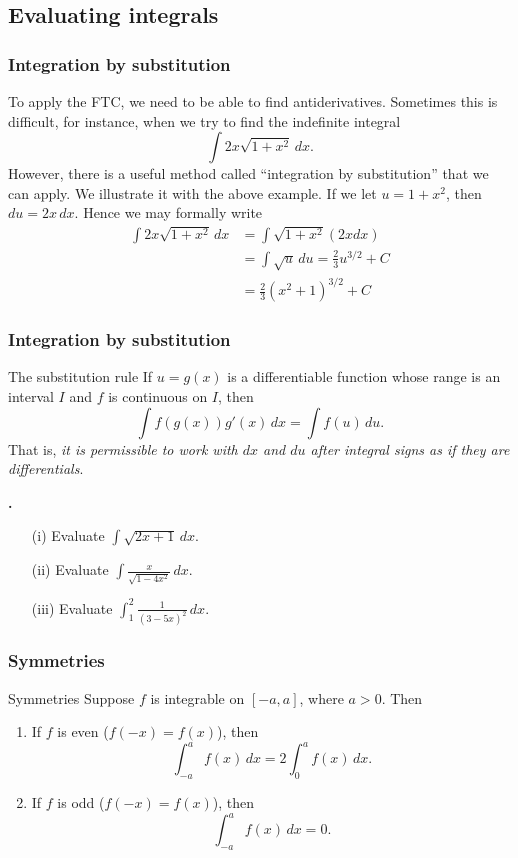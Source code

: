 \documentclass[t]{beamer}
\theoremstyle{plain}
\theoremstyle{definition}
\newcommand{\ds}{\displaystyle}
\newcommand{\dx}{\,dx}
\newcounter{heading}
\newcommand{\newhead}[1]{\medskip\stepcounter{heading}\noindent\textbf{\hspace{0.2cm}{#1}.}}
\begin{document}
\subsection{Evaluating integrals}
\begin{frame}
\frametitle{Integration by substitution}

To apply the FTC, we need to be able to find antiderivatives.  Sometimes this is difficult, for instance, when we try to find the indefinite integral
\[ \int 2x\sqrt{1 + x^{2}}\,dx.\]\pause
However, there is a useful method called ``integration by substitution'' that we can apply.  We illustrate it with the above example.  \pause
\medskip
\noindent If we let $u = 1 + x^{2}$, then $du = 2x\, dx$.  Hence we may formally write
\begin{align} \int 2x\sqrt{1+x^{2}}\,dx &= \int \sqrt{1+x^{2}}(2xdx) \nonumber  \\
 &= \int \sqrt{u}\, du = \frac{2}{3}u^{3/2} + C \nonumber \\
 &= \frac{2}{3}(x^{2}+1)^{3/2} + C \nonumber
\end{align}

\end{frame}

\begin{frame}
\frametitle{Integration by substitution}
\begin{block}{The substitution rule}
If $u = g(x)$ is a differentiable function whose range is an interval $I$ and $f$ is continuous on $I$, then
\[ \int f(g(x))g'(x)\,dx = \int f(u)\,du.\]
That is, \emph{it is permissible to work with $dx$ and $du$ after integral signs as if they are differentials}.
\end{block}\pause

\newhead{Examples}
\begin{enumerate}[<+->]
\item[(i)] Evaluate $\int \sqrt{2x +1}\,dx.$
\item[(ii)] Evaluate $\int \frac{x}{\sqrt{1-4x^{2}}}\,dx.$

\item[(iii)] Evaluate $\ds\int_{1}^{2}\frac{1}{(3-5x)^{2}}\,dx.$
\end{enumerate}

\end{frame}

\begin{frame}
\frametitle{Symmetries}
\begin{block}{Symmetries}
Suppose $f$ is integrable on $[-a,a]$, where $a>0$. Then
\begin{enumerate}[<+->]
\item If $f$ is even ($f(-x)=f(x)$), then \[\int_{-a}^af(x)\dx=2\int_0^af(x)\dx.\]
\item If $f$ is odd ($f(-x)=f(x)$), then \[\int_{-a}^af(x)\dx=0.\]
\end{enumerate}
\end{block}
\end{frame}
\end{document}
